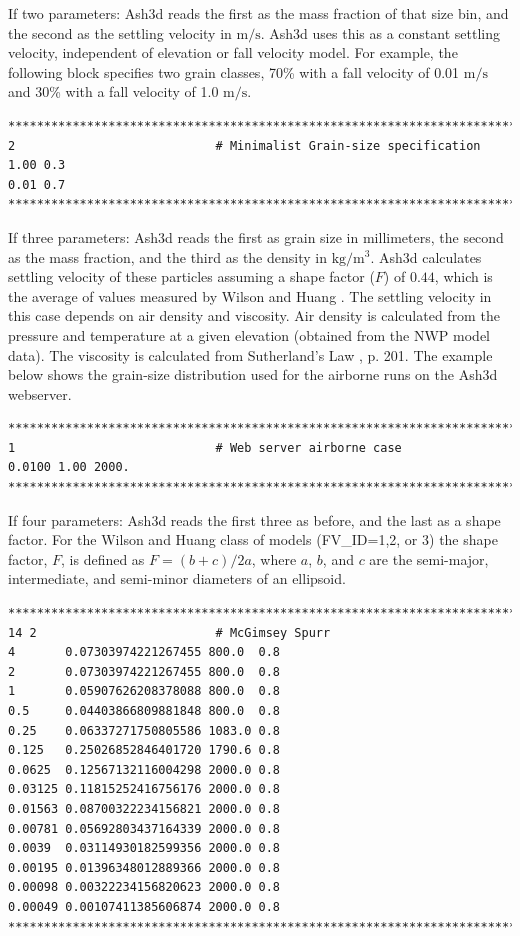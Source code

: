 If two parameters: Ash3d reads the first as the mass fraction of that size bin, and
the second as the settling velocity in $\mathrm{m/s}$. Ash3d uses this as a constant settling
velocity, independent of elevation or fall velocity model. For example, the following block
specifies two grain classes, 70\% with a fall velocity of 0.01 $\mathrm{m/s}$ and 
30\% with a fall velocity of 1.0 $\mathrm{m/s}$.
\small
\begin{verbatim}
*******************************************************************************
2                            # Minimalist Grain-size specification
1.00 0.3
0.01 0.7
*******************************************************************************
\end{verbatim}
\normalsize
If three parameters: Ash3d reads the first as grain size in millimeters, the second
as the mass fraction, and the third as the density in $\mathrm{kg/m^3}$.
Ash3d calculates settling
velocity of these particles assuming a shape factor ($F$) of $0.44$, which is the average
of values measured by Wilson and Huang \cite{Wilson1979}. The settling velocity in this case
depends on air density and viscosity. Air density is calculated from the pressure
and temperature at a
given elevation (obtained from the NWP model data). The viscosity is calculated from
Sutherland’s Law \cite{Jacobson2005}, p. 201. The example below shows the grain-size
distribution used for the airborne runs on the Ash3d webserver.
\small
\begin{verbatim}
*******************************************************************************
1                            # Web server airborne case
0.0100 1.00 2000.
*******************************************************************************
\end{verbatim}
\normalsize
If four parameters: Ash3d reads the first three as before, and the last as a
shape factor. For the Wilson and Huang class of models (FV\_ID=1,2, or 3)
the shape factor, $F$, is defined as $F=(b+c)/2a$, where $a$, $b$, and $c$ are the
semi-major, intermediate, and semi-minor diameters of an ellipsoid.
\small
\begin{verbatim}
*******************************************************************************
14 2                         # McGimsey Spurr
4       0.07303974221267455 800.0  0.8
2       0.07303974221267455 800.0  0.8
1       0.05907626208378088 800.0  0.8
0.5     0.04403866809881848 800.0  0.8
0.25    0.06337271750805586 1083.0 0.8
0.125   0.25026852846401720 1790.6 0.8
0.0625  0.12567132116004298 2000.0 0.8
0.03125 0.11815252416756176 2000.0 0.8
0.01563 0.08700322234156821 2000.0 0.8
0.00781 0.05692803437164339 2000.0 0.8
0.0039  0.03114930182599356 2000.0 0.8
0.00195 0.01396348012889366 2000.0 0.8
0.00098 0.00322234156820623 2000.0 0.8
0.00049 0.00107411385606874 2000.0 0.8
*******************************************************************************
\end{verbatim}
